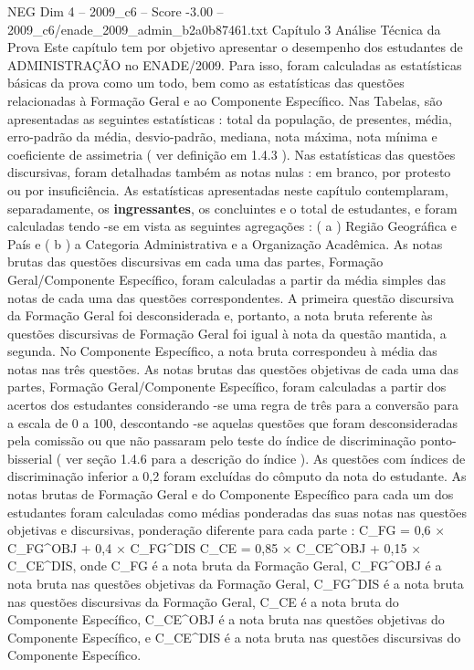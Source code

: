 \begin{textsample}{NEG Dim 4 – 2009\_c6 – Score -3.00 – 2009\_c6/enade\_2009\_admin\_b2a0b87461.txt}  \label{ex:f4_neg_038}
Capítulo 3 Análise Técnica da Prova Este capítulo tem por objetivo apresentar o desempenho dos estudantes de ADMINISTRAÇÃO no ENADE/2009.
Para isso, foram calculadas as estatísticas básicas da prova como um todo, bem como as estatísticas das questões relacionadas à Formação Geral e ao Componente Específico.
Nas Tabelas, são apresentadas as seguintes estatísticas : total da população, de presentes, média, erro-padrão da média, desvio-padrão, mediana, nota máxima, nota mínima e coeficiente de assimetria ( ver definição em 1.4.3 ).
Nas estatísticas das questões discursivas, foram detalhadas também as notas nulas : em branco, por protesto ou por insuficiência.
As estatísticas apresentadas neste capítulo contemplaram, separadamente, os \textbf{ingressantes}, os concluintes e o total de estudantes, e foram calculadas tendo -se em vista as seguintes agregações : ( a ) Região Geográfica e País e ( b ) a Categoria Administrativa e a Organização Acadêmica.
As notas brutas das questões discursivas em cada uma das partes, Formação Geral/Componente Específico, foram calculadas a partir da média simples das notas de cada uma das questões correspondentes.
A primeira questão discursiva da Formação Geral foi desconsiderada e, portanto, a nota bruta referente às questões discursivas de Formação Geral foi igual à nota da questão mantida, a segunda.
No Componente Específico, a nota bruta correspondeu à média das notas nas três questões.
As notas brutas das questões objetivas de cada uma das partes, Formação Geral/Componente Específico, foram calculadas a partir dos acertos dos estudantes considerando -se uma regra de três para a conversão para a escala de 0 a 100, descontando -se aquelas questões que foram desconsideradas pela comissão ou que não passaram pelo teste do índice de discriminação ponto-bisserial ( ver seção 1.4.6 para a descrição do índice ).
As questões com índices de discriminação inferior a 0,2 foram excluídas do cômputo da nota do estudante.
As notas brutas de Formação Geral e do Componente Específico para cada um dos estudantes foram calculadas como médias ponderadas das suas notas nas questões objetivas e discursivas, ponderação diferente para cada parte : C\_FG = 0,6 × C\_FG\textasciicircum{}OBJ + 0,4 × C\_FG\textasciicircum{}DIS C\_CE = 0,85 × C\_CE\textasciicircum{}OBJ + 0,15 × C\_CE\textasciicircum{}DIS, onde C\_FG é a nota bruta da Formação Geral, C\_FG\textasciicircum{}OBJ é a nota bruta nas questões objetivas da Formação Geral, C\_FG\textasciicircum{}DIS é a nota bruta nas questões discursivas da Formação Geral, C\_CE é a nota bruta do Componente Específico, C\_CE\textasciicircum{}OBJ é a nota bruta nas questões objetivas do Componente Específico, e C\_CE\textasciicircum{}DIS é a nota bruta nas questões discursivas do Componente Específico.

\end{textsample}
